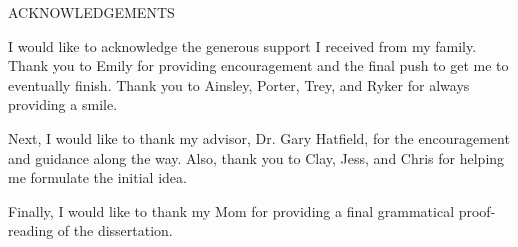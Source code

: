 \documentclass[SDSUThesis.tex]{subfiles}
\begin{document}
\newpage

\begin{center}
ACKNOWLEDGEMENTS\\
\end{center}

I would like to acknowledge the generous support I received from my family. Thank you
to Emily for providing encouragement and the final push to get me to eventually finish.
Thank you to Ainsley, Porter, Trey, and Ryker for always providing a smile.

Next, I would like to thank my advisor, Dr. Gary Hatfield, for the encouragement and guidance
along the way.  Also, thank you to Clay, Jess, and Chris for helping me formulate 
the initial idea.  

Finally, I would like to thank my Mom for providing a 
final grammatical proof-reading of the dissertation.
\end{document}

